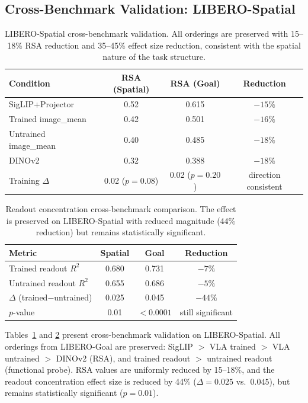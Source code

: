 \documentclass[letterpaper]{article}
\begin{document}
\subsection{Cross-Benchmark Validation: LIBERO-Spatial}
\label{sec:exp-spatial}

\begin{table}[t]
\centering
\caption{LIBERO-Spatial cross-benchmark validation. All orderings are preserved with 15--18\% RSA reduction and 35--45\% effect size reduction, consistent with the spatial nature of the task structure.}
\label{tab:spatial-rsa}
\begin{tabular}{lccc}
\toprule
\textbf{Condition} & \textbf{RSA (Spatial)} & \textbf{RSA (Goal)} & \textbf{Reduction} \\
\midrule
SigLIP+Projector      & 0.52  & 0.615 & $-15\%$ \\
Trained image\_mean   & 0.42  & 0.501 & $-16\%$ \\
Untrained image\_mean & 0.40  & 0.485 & $-18\%$ \\
DINOv2                & 0.32  & 0.388 & $-18\%$ \\
\midrule
Training $\Delta$     & 0.02 ($p{=}0.08$) & 0.02 ($p{=}0.20$) & direction consistent \\
\bottomrule
\end{tabular}
\end{table}

\begin{table}[t]
\centering
\caption{Readout concentration cross-benchmark comparison. The effect is preserved on LIBERO-Spatial with reduced magnitude (44\% reduction) but remains statistically significant.}
\label{tab:spatial-readout}
\begin{tabular}{lccc}
\toprule
\textbf{Metric} & \textbf{Spatial} & \textbf{Goal} & \textbf{Reduction} \\
\midrule
Trained readout $R^2$   & 0.680 & 0.731 & $-7\%$ \\
Untrained readout $R^2$ & 0.655 & 0.686 & $-5\%$ \\
$\Delta$ (trained$-$untrained) & 0.025 & 0.045 & $-44\%$ \\
$p$-value               & 0.01  & ${<}0.0001$ & still significant \\
\bottomrule
\end{tabular}
\end{table}

Tables~\ref{tab:spatial-rsa} and \ref{tab:spatial-readout} present cross-benchmark validation on LIBERO-Spatial.
All orderings from LIBERO-Goal are preserved: SigLIP $>$ VLA trained $>$ VLA untrained $>$ DINOv2 (RSA), and trained readout $>$ untrained readout (functional probe).
RSA values are uniformly reduced by 15--18\%, and the readout concentration effect size is reduced by 44\% ($\Delta{=}0.025$ vs.\ $0.045$), but remains statistically significant ($p{=}0.01$).
\end{document}
